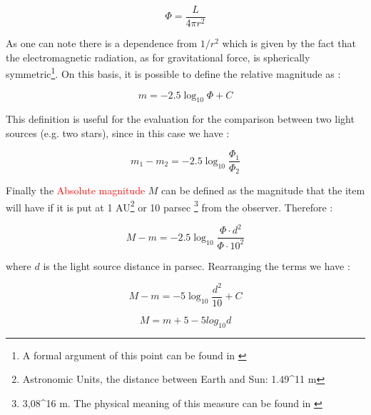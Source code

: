 \documentclass[12pt,%
               a4paper,%
               oneside,openany,%
               titlepage,%
               headinclude,footinclude,%
               BCOR5mm,%
               cleardoublepage=empty,%
               tablecaptionabove,%
               floatperchapter,
               ]{scrreprt}                 %
\begin{document}
\begin{equation}
\Phi=\frac{L}{4\pi r^{2}}
\end{equation}

As one can note there is a dependence from $1/r^{2}$ which is given by the fact that the electromagnetic radiation, as for gravitational force, is spherically symmetric\footnote{A formal argument of this point can be found in \cite{zee2013einstein}}. On this basis, it is possible to define the relative magnitude as \cite{burbine2016asteroids}:

\begin{equation}
m=-2.5\log_{10}\Phi+C
\end{equation}

This definition is useful for the evaluation for the comparison between two light sources (e.g. two stars), since in this case we have \cite{burbine2016asteroids}:

\begin{equation}
m_{1}-m_{2}=-2.5\log_{10}\frac{\Phi_{1}}{\Phi_{2}}
\end{equation}

Finally the \textcolor{red}{Absolute magnitude} $M$ can be defined as the magnitude that the item will have if it is put at 1 AU\footnote{Astronomic Units, the distance between Earth and Sun: 1.49^{11} m} or 10 parsec \footnote{3,08^{16} m. The physical meaning of this measure can be found in \cite{burbine2016asteroids}} from the observer. Therefore  \cite{burbine2016asteroids}:

\begin{equation}
M-m=-2.5\log_{10}\frac{\Phi\cdot d^{2} }{\Phi\cdot 10^{2}}
\end{equation}

where $d$ is the light source distance in parsec. Rearranging the terms we have \cite{burbine2016asteroids}:

\begin{equation}
M-m=-5\log_{10}\frac{ d^{2} }{10}+C
\end{equation}

\begin{equation}
M=m+5-5log_{10}d
\end{equation}
\end{document}
